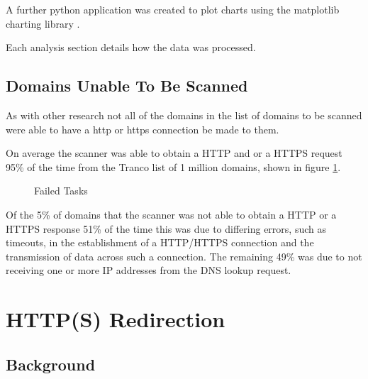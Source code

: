 \documentclass{mscreport}
\begin{document}
\vspace{0.3cm} \noindent
A further python application was created to plot charts using the matplotlib charting library \cite{noauthor_undated-po}.

\vspace{0.3cm} \noindent
Each analysis section details how the data was processed.


\subsection{Domains Unable To Be Scanned}

As with other research not all of the domains in the list of domains to be scanned were able to have a http or https connection be made to them.

\vspace{0.3cm} \noindent
On average the scanner was able to obtain a HTTP and or a HTTPS request 95\% of the time from the Tranco list of 1 million domains, shown in figure \ref{fig:failed_tasks}.

\begin{figure}[H]
	\begin{center}
		\caption{Failed Tasks}
		\label{fig:failed_tasks}
	\end{center}
\end{figure}

\noindent
Of the 5\% of domains that the scanner was not able to obtain a HTTP or a HTTPS response 51\% of the time this was due to differing errors, such as timeouts, in the establishment of a HTTP/HTTPS connection and the transmission of data across such a connection. The remaining 49\% was due to not receiving one or more IP addresses from the DNS lookup request.


\clearpage 

\newpage

\section{HTTP(S) Redirection}

\subsection{Background}
\end{document}
